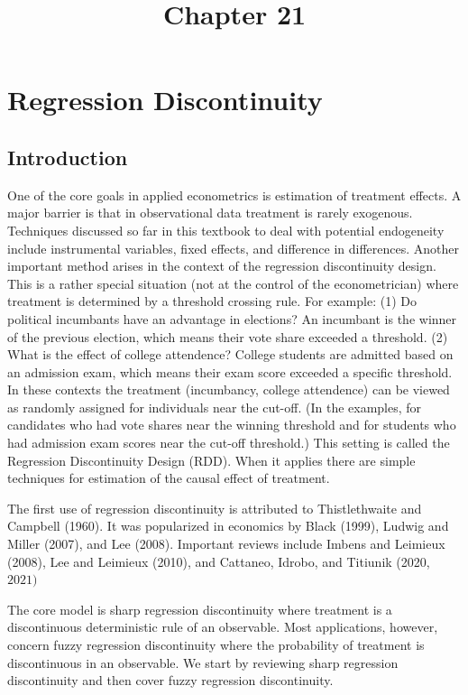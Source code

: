 \documentclass[10pt]{article}
\title{Chapter 21 }
\author{}
\date{}
\begin{document}
\maketitle
\section{Regression Discontinuity}
\subsection{Introduction}
One of the core goals in applied econometrics is estimation of treatment effects. A major barrier is that in observational data treatment is rarely exogenous. Techniques discussed so far in this textbook to deal with potential endogeneity include instrumental variables, fixed effects, and difference in differences. Another important method arises in the context of the regression discontinuity design. This is a rather special situation (not at the control of the econometrician) where treatment is determined by a threshold crossing rule. For example: (1) Do political incumbants have an advantage in elections? An incumbant is the winner of the previous election, which means their vote share exceeded a threshold. (2) What is the effect of college attendence? College students are admitted based on an admission exam, which means their exam score exceeded a specific threshold. In these contexts the treatment (incumbancy, college attendence) can be viewed as randomly assigned for individuals near the cut-off. (In the examples, for candidates who had vote shares near the winning threshold and for students who had admission exam scores near the cut-off threshold.) This setting is called the Regression Discontinuity Design (RDD). When it applies there are simple techniques for estimation of the causal effect of treatment.

The first use of regression discontinuity is attributed to Thistlethwaite and Campbell (1960). It was popularized in economics by Black (1999), Ludwig and Miller (2007), and Lee (2008). Important reviews include Imbens and Leimieux (2008), Lee and Leimieux (2010), and Cattaneo, Idrobo, and Titiunik (2020, $2021)$

The core model is sharp regression discontinuity where treatment is a discontinuous deterministic rule of an observable. Most applications, however, concern fuzzy regression discontinuity where the probability of treatment is discontinuous in an observable. We start by reviewing sharp regression discontinuity and then cover fuzzy regression discontinuity.
\end{document}
